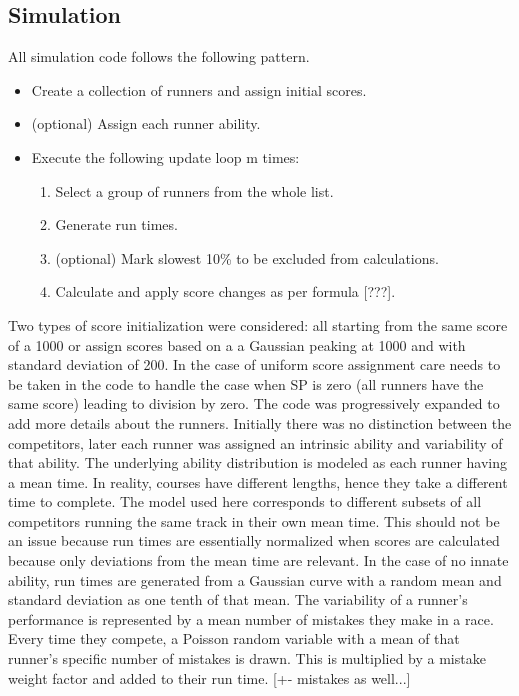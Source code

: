 \subsection{Simulation}
All simulation code follows the following pattern.
\begin{itemize}
\item Create a collection of runners and assign initial scores.
\item (optional) Assign each runner ability.
\item Execute the following update loop m times:
	\begin{enumerate}
	\item Select a group of runners from the whole list.
	\item Generate run times.
	\item (optional) Mark slowest 10\% to be excluded from calculations.
	\item Calculate and apply score changes as per formula [???].
	\end{enumerate}
\end{itemize}

Two types of score initialization were considered: all starting from the same score of a 1000 or assign scores based on a a Gaussian peaking at 1000 and with standard deviation of 200. In the case of uniform score assignment care needs to be taken in the code to handle the case when SP is zero (all runners have the same score) leading to division by zero.
The code was progressively expanded to add more details about the runners. Initially there was no distinction between the competitors, later each runner was assigned an intrinsic ability and variability of that ability. The underlying ability distribution is modeled as each runner having a mean time. In reality, courses have different lengths, hence they take a different time to complete. The model used here corresponds to different subsets of all competitors running the same track in their own mean time. This should not be an issue because run times are essentially normalized when scores are calculated because only deviations from the mean time are relevant.
In the case of no innate ability, run times are generated from a Gaussian curve with a random mean and standard deviation as one tenth of that mean. 
The variability of a runner's performance is represented by a mean number of mistakes they make in a race. Every time they compete, a Poisson random variable with a mean of that runner's specific number of mistakes is drawn. This is multiplied by a mistake weight factor and added to their run time. [+- mistakes as well...]

